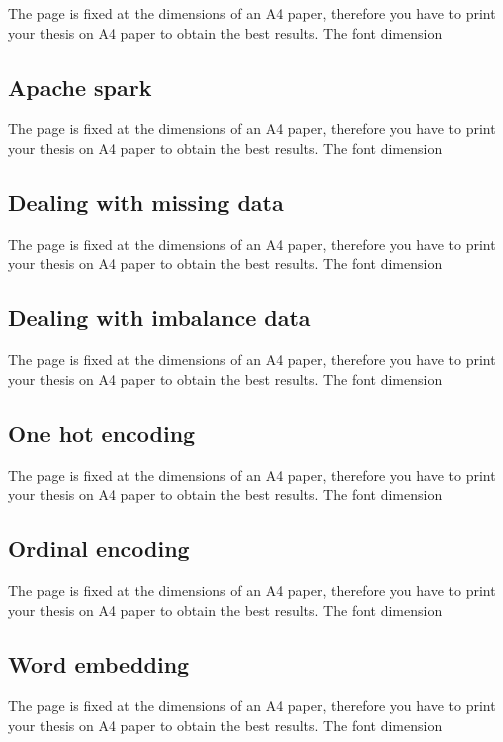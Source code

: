 \documentclass[LaM,binding=0.6cm, english]{sapthesis}
\begin{document}
The page is fixed at the dimensions of an A4 paper, therefore you have to print your thesis on A4 paper to obtain the best results. The font dimension

\subsection{Apache spark}

The page is fixed at the dimensions of an A4 paper, therefore you have to print your thesis on A4 paper to obtain the best results. The font dimension

\subsection{Dealing with missing data}

The page is fixed at the dimensions of an A4 paper, therefore you have to print your thesis on A4 paper to obtain the best results. The font dimension

\subsection{Dealing with imbalance data}

The page is fixed at the dimensions of an A4 paper, therefore you have to print your thesis on A4 paper to obtain the best results. The font dimension

\subsection{One hot encoding}

The page is fixed at the dimensions of an A4 paper, therefore you have to print your thesis on A4 paper to obtain the best results. The font dimension

\subsection{Ordinal encoding}

The page is fixed at the dimensions of an A4 paper, therefore you have to print your thesis on A4 paper to obtain the best results. The font dimension

\subsection{Word embedding}

The page is fixed at the dimensions of an A4 paper, therefore you have to print your thesis on A4 paper to obtain the best results. The font dimension
\end{document}
